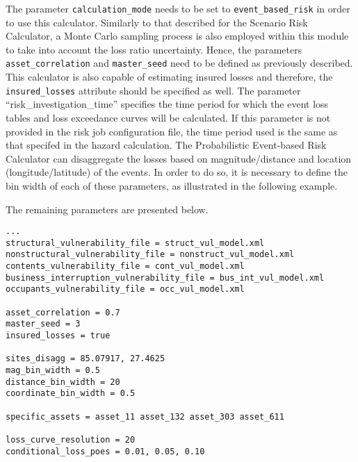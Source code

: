 The parameter \Verb+calculation_mode+ needs to be set to \Verb+event_based_risk+ in order to use this calculator. Similarly to that described for the Scenario Risk Calculator, a Monte Carlo sampling process is also employed within this module to take into account the loss ratio uncertainty. Hence, the parameters \Verb+asset_correlation+ and \Verb+master_seed+ need to be defined as previously described. This calculator is also capable of estimating insured losses and therefore, the \Verb+insured_losses+ attribute should be specified as well. The parameter ``risk\_investigation\_time'' specifies the time period for which the event loss tables and loss exceedance curves will be calculated. If this parameter is not provided in the risk job configuration file, the time period used is the same as that specifed in the hazard calculation. The Probabilistic Event-based Risk Calculator can disaggregate the losses based on magnitude/distance and location (longitude/latitude) of the events. In order to do so, it is necessary to define the bin width of each of these parameters, as illustrated in the following example.

The remaining parameters are presented below.

\begin{Verbatim}[frame=single, commandchars=\\\{\}, samepage=true]
...
structural_vulnerability_file = struct_vul_model.xml
nonstructural_vulnerability_file = nonstruct_vul_model.xml
contents_vulnerability_file = cont_vul_model.xml
business_interruption_vulnerability_file = bus_int_vul_model.xml
occupants_vulnerability_file = occ_vul_model.xml

asset_correlation = 0.7
master_seed = 3
insured_losses = true

sites_disagg = 85.07917, 27.4625
mag_bin_width = 0.5
distance_bin_width = 20
coordinate_bin_width = 0.5

specific_assets = asset_11 asset_132 asset_303 asset_611

loss_curve_resolution = 20
conditional_loss_poes = 0.01, 0.05, 0.10
\end{Verbatim}

